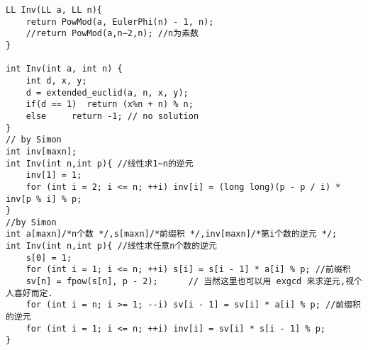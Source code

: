 \begin{lstlisting}
LL Inv(LL a, LL n){
	return PowMod(a, EulerPhi(n) - 1, n); 
	//return PowMod(a,n−2,n); //n为素数
}

int Inv(int a, int n) {
	int d, x, y;
	d = extended_euclid(a, n, x, y);
	if(d == 1)  return (x%n + n) % n;
	else     return -1; // no solution
}
// by Simon
int inv[maxn];
int Inv(int n,int p){ //线性求1~n的逆元
	inv[1] = 1;
	for (int i = 2; i <= n; ++i) inv[i] = (long long)(p - p / i) * inv[p % i] % p;
}
//by Simon
int a[maxn]/*n个数 */,s[maxn]/*前缀积 */,inv[maxn]/*第i个数的逆元 */; 
int Inv(int n,int p){ //线性求任意n个数的逆元
	s[0] = 1;
	for (int i = 1; i <= n; ++i) s[i] = s[i - 1] * a[i] % p; //前缀积
	sv[n] = fpow(s[n], p - 2);		// 当然这里也可以用 exgcd 来求逆元,视个人喜好而定.
	for (int i = n; i >= 1; --i) sv[i - 1] = sv[i] * a[i] % p; //前缀积的逆元
	for (int i = 1; i <= n; ++i) inv[i] = sv[i] * s[i - 1] % p;
}
\end{lstlisting}